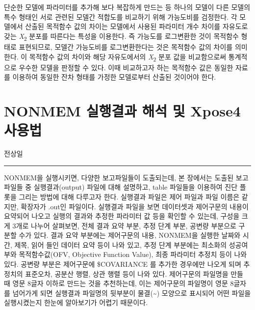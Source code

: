 \documentclass[
  10pt,
  krantz2,
  a4paper]{krantz}
\theoremstyle{definition}
\theoremstyle{definition}
\theoremstyle{definition}
\theoremstyle{remark}
\begin{document}
단순한 모델에 파라미터를 추가해 보다 복잡하게 만드는 등 하나의 모델이 다른 모델의 특수 형태인 서로 관련된 모델간 적합도를 비교하기 위해 가능도비를 검정한다. 각 모델에서 산출된 목적함수 값의 차이는 모델에서 사용된 파라미터 개수 차이를 자유도로 갖는 \emph{Χ}\textsubscript{2} 분포를 따른다는 특성을 이용한다. 즉 가능도를 로그변환한 것이 목적함수 형태로 표현되므로, 모델간 가능도비를 로그변환한다는 것은 목적함수 값의 차이를 의미한다. 이 목적함수 값의 차이와 해당 자유도에서의 \emph{Χ}\textsubscript{2} 분포 값을 비교함으로써 통계적으로 우수한 모델을 판정할 수 있다. 이때 비교하고자 하는 목적함수 값은 동일한 자료를 이용하여 동일한 잔차 형태를 가정한 모델로부터 산출된 것이어야 한다.

\hypertarget{use-of-xpose4}{%
\chapter{NONMEM 실행결과 해석 및 Xpose4 사용법}\label{use-of-xpose4}}

전상일

\begin{center}\rule{0.5\linewidth}{0.5pt}\end{center}

NONMEM을 실행시키면, 다양한 보고파일들이 도출되는데, 본 장에서는 도출된 보고파일들 중 실행결과(output) 파일에 대해 설명하고, table 파일들을 이용하여 진단 플롯을 그리는 방법에 대해 다루고자 한다. 실행결과 파일은 제어 파일과 파일 이름은 같지만, 확장자가 .out인 파일이다. 실행결과 파일을 보면 데이터셋과 제어구문의 내용이 요약되어 나오고 실행의 결과와 추정한 파라미터 값 등을 확인할 수 있는데, 구성을 크게 3개로 나누어 살펴보면, 전체 결과 요약 부분, 추정 단계 부분, 공변량 부분으로 구분할 수가 있다. 결과 요약 부분에는 제어구문의 내용, NONMEM을 실행한 날짜와 시간, 제목, 읽어 들인 데이터 요약 등이 나와 있고, 추정 단계 부분에는 최소화의 성공여부와 목적함수값(OFV, Objective Function Value), 최종 파라미터 추정치 등이 나와 있다. 공변량 부분은 제어구문에 \$COVARIANCE 를 추가한 경우에만 나오게 되며 추정치의 표준오차, 공분산 행렬, 상관 행렬 등이 나와 있다. 제어구문의 파일명을 만들 때 영문 8글자 이하로 만드는 것을 추천하는데, 이는 제어구문의 파일명이 영문 8글자를 넘어가게 되면 실행결과 파일명의 뒷부분이 물결(\textasciitilde) 모양으로 표시되어 어떤 파일을 실행시켰는지 한눈에 알아보기가 어렵기 때문이다.
\end{document}
